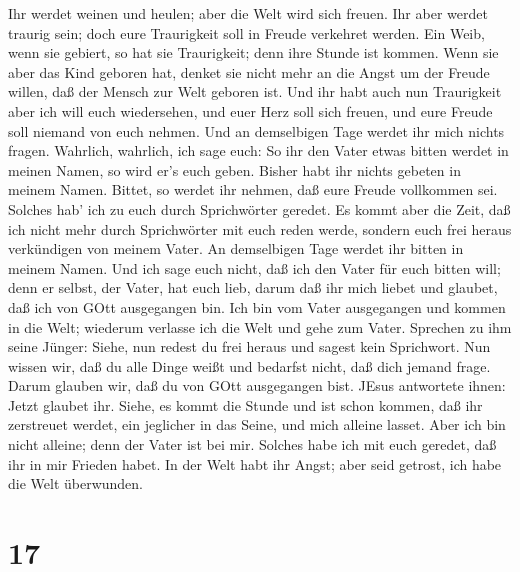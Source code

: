 Ihr werdet weinen und heulen; aber die Welt wird sich freuen. Ihr aber
werdet traurig sein; doch eure Traurigkeit soll in Freude verkehret
werden.  Ein Weib, wenn sie gebiert, so hat sie
Traurigkeit; denn ihre Stunde ist kommen. Wenn sie aber das Kind geboren
hat, denket sie nicht mehr an die Angst um der Freude willen, daß der
Mensch zur Welt geboren ist.  Und ihr habt auch nun
Traurigkeit aber ich will euch wiedersehen, und euer Herz soll sich
freuen, und eure Freude soll niemand von euch nehmen.  Und
an demselbigen Tage werdet ihr mich nichts fragen. Wahrlich, wahrlich,
ich sage euch: So ihr den Vater etwas bitten werdet in meinen Namen, so
wird er's euch geben.  Bisher habt ihr nichts gebeten in
meinem Namen. Bittet, so werdet ihr nehmen, daß eure Freude vollkommen
sei.  Solches hab' ich zu euch durch Sprichwörter geredet.
Es kommt aber die Zeit, daß ich nicht mehr durch Sprichwörter mit euch
reden werde, sondern euch frei heraus verkündigen von meinem Vater.
 An demselbigen Tage werdet ihr bitten in meinem Namen. Und
ich sage euch nicht, daß ich den Vater für euch bitten will;
 denn er selbst, der Vater, hat euch lieb, darum daß ihr
mich liebet und glaubet, daß ich von GOtt ausgegangen bin. 
Ich bin vom Vater ausgegangen und kommen in die Welt; wiederum verlasse
ich die Welt und gehe zum Vater.  Sprechen zu ihm seine
Jünger: Siehe, nun redest du frei heraus und sagest kein Sprichwort.
 Nun wissen wir, daß du alle Dinge weißt und bedarfst
nicht, daß dich jemand frage. Darum glauben wir, daß du von GOtt
ausgegangen bist.  JEsus antwortete ihnen: Jetzt glaubet
ihr.  Siehe, es kommt die Stunde und ist schon kommen, daß
ihr zerstreuet werdet, ein jeglicher in das Seine, und mich alleine
lasset. Aber ich bin nicht alleine; denn der Vater ist bei mir.
 Solches habe ich mit euch geredet, daß ihr in mir Frieden
habet. In der Welt habt ihr Angst; aber seid getrost, ich habe die Welt
überwunden.

\hypertarget{section-16}{%
\section{17}\label{section-16}}

